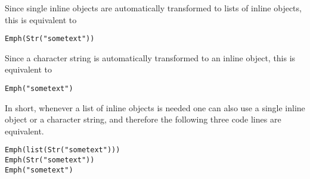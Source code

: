\documentclass[a4paper]{article}\usepackage[]{graphicx}\usepackage[]{color}
\makeatletter
\newcommand{\hlstr}[1]{\textcolor[rgb]{0.741,0.553,0.545}{#1}}%
\newcommand{\hlstd}[1]{\textcolor[rgb]{0,0,0}{#1}}%
\newcommand{\hlkwd}[1]{\textcolor[rgb]{0,0,0}{#1}}%
\newenvironment{kframe}{%
 \def\at@end@of@kframe{}%
 \ifinner\ifhmode%
  \def\at@end@of@kframe{\end{minipage}}%
  \begin{minipage}{\columnwidth}%
 \fi\fi%
 \def\FrameCommand##1{\hskip\@totalleftmargin \hskip-\fboxsep
 \colorbox{shadecolor}{##1}\hskip-\fboxsep
     \hskip-\linewidth \hskip-\@totalleftmargin \hskip\columnwidth}%
 \MakeFramed {\advance\hsize-\width
   \@totalleftmargin\z@ \linewidth\hsize
   \@setminipage}}%
 {\par\unskip\endMakeFramed%
 \at@end@of@kframe}
\newenvironment{knitrout}{}{} %
\makeatother
\begin{document}
Since single inline objects are automatically transformed to lists of inline 
objects, this is equivalent to 
\begin{knitrout}
\color{fgcolor}\begin{kframe}
\begin{alltt}
\hlkwd{Emph}\hlstd{(}\hlkwd{Str}\hlstd{(}\hlstr{"some text"}\hlstd{))}
\end{alltt}
\end{kframe}
\end{knitrout}

Since a character  string is automatically transformed to an inline object, 
this is equivalent to 
\begin{knitrout}
\color{fgcolor}\begin{kframe}
\begin{alltt}
\hlkwd{Emph}\hlstd{(}\hlstr{"some text"}\hlstd{)}
\end{alltt}
\end{kframe}
\end{knitrout}

In short, whenever a list of inline objects is needed one can also use a 
single inline object or a character string, and therefore the following 
three code lines are equivalent.   

\begin{knitrout}
\color{fgcolor}\begin{kframe}
\begin{alltt}
\hlkwd{Emph}\hlstd{(}\hlkwd{list}\hlstd{(}\hlkwd{Str}\hlstd{(}\hlstr{"some text"}\hlstd{)))}
\hlkwd{Emph}\hlstd{(}\hlkwd{Str}\hlstd{(}\hlstr{"some text"}\hlstd{))}
\hlkwd{Emph}\hlstd{(}\hlstr{"some text"}\hlstd{)}
\end{alltt}
\end{kframe}
\end{knitrout}
\end{document}
